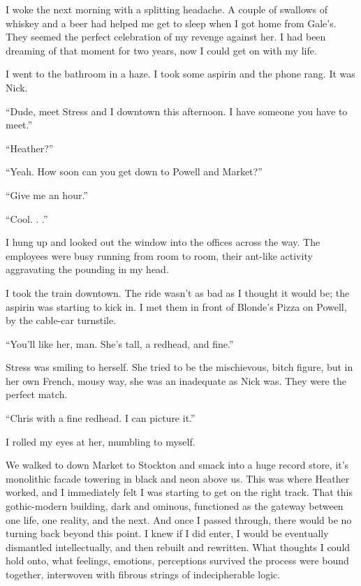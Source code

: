 I woke the next morning with a splitting headache. A couple of swallows
of whiskey and a beer had helped me get to sleep when I got home from
Gale's. They seemed the perfect celebration of my revenge against her. I
had been dreaming of that moment for two years, now I could get on with
my life.

I went to the bathroom in a haze. I took some aspirin and the phone
rang. It was Nick.

``Dude, meet Stress and I downtown this afternoon. I have someone you
have to meet.''

``Heather?''

``Yeah. How soon can you get down to Powell and Market?''

``Give me an hour.''

``Cool. . .''

I hung up and looked out the window into the offices across the way. The
employees were busy running from room to room, their ant-like activity
aggravating the pounding in my head.

I took the train downtown. The ride wasn't as bad as I thought it would
be; the aspirin was starting to kick in. I met them in front of Blonde's
Pizza on Powell, by the cable-car turnstile.

``You'll like her, man. She's tall, a redhead, and fine.''

Stress was smiling to herself. She tried to be the mischievous, bitch
figure, but in her own French, mousy way, she was an inadequate as Nick
was. They were the perfect match.

``Chris with a fine redhead. I can picture it.''

I rolled my eyes at her, mumbling to myself.

We walked to down Market to Stockton and smack into a huge record store,
it's monolithic facade towering in black and neon above us. This was
where Heather worked, and I immediately felt I was starting to get on
the right track. That this gothic-modern building, dark and ominous,
functioned as the gateway between one life, one reality, and the next.
And once I passed through, there would be no turning back beyond this
point. I knew if I did enter, I would be eventually dismantled
intellectually, and then rebuilt and rewritten. What thoughts I could
hold onto, what feelings, emotions, perceptions survived the process
were bound together, interwoven with fibrous strings of indecipherable
logic.

